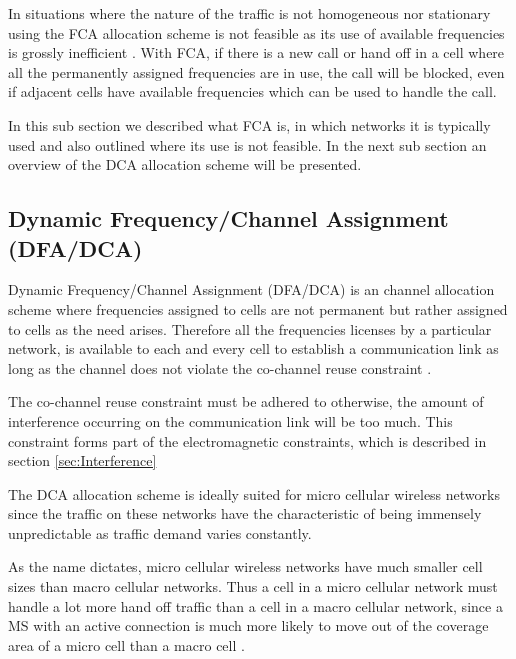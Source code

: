 In situations where the nature of the traffic is not homogeneous nor stationary using the FCA allocation scheme is not feasible as its use of available frequencies is grossly inefficient \cite{PrinciplesMobileCommunication}. With FCA, if there is a new call or hand off in a cell where all the permanently assigned frequencies are in use, the call will be blocked, even if adjacent cells have available frequencies which can be used to handle the call\cite{PrinciplesMobileCommunication}.

In this sub section we described what FCA is, in which networks it is typically used and also outlined where its use is not feasible. In the next sub section an overview of the DCA allocation scheme will be presented.
\subsection{Dynamic Frequency/Channel Assignment (DFA/DCA)}
Dynamic Frequency/Channel Assignment (DFA/DCA) is an channel allocation scheme where frequencies assigned to cells are not permanent but rather assigned to cells as the need arises\cite{PrinciplesMobileCommunication}. Therefore all the frequencies licenses by a particular network, is available to each and every cell to establish a communication link as long as the channel does not violate the co-channel reuse constraint \cite{PrinciplesMobileCommunication}. 

The co-channel reuse constraint must be adhered to otherwise, the amount of interference occurring on the communication link will be too much. This constraint forms part of the electromagnetic constraints, which is described in section \ref{sec:Interference}

The DCA allocation scheme is ideally suited for micro cellular wireless networks since the traffic on these networks have the characteristic of being immensely unpredictable as traffic demand varies constantly\cite{PrinciplesMobileCommunication,WirelessCommunications,MobileWirelessCommunicationss}.

As the name dictates, micro cellular wireless networks have much smaller cell sizes than macro cellular networks. Thus a cell in a micro cellular network must handle a lot more hand off traffic than a cell in a macro cellular network, since a MS with an active connection is much more likely to move out of the coverage area of a micro cell than a macro cell \cite{PrinciplesMobileCommunication,WirelessCommunications,MobileWirelessCommunicationss}.

